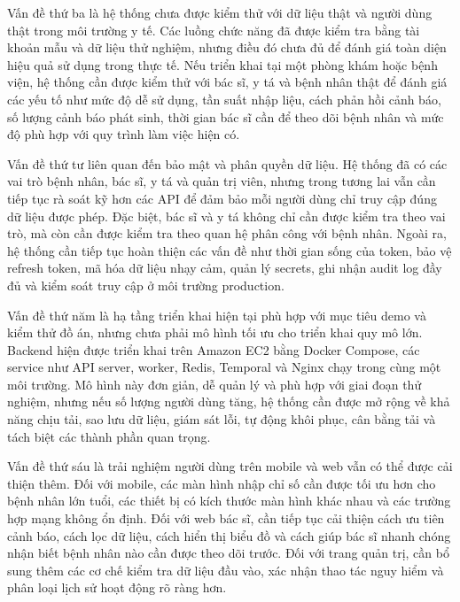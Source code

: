 \par Vấn đề thứ ba là hệ thống chưa được kiểm thử với dữ liệu thật và người dùng thật trong môi trường y tế. Các luồng chức năng đã được kiểm tra bằng tài khoản mẫu và dữ liệu thử nghiệm, nhưng điều đó chưa đủ để đánh giá toàn diện hiệu quả sử dụng trong thực tế. Nếu triển khai tại một phòng khám hoặc bệnh viện, hệ thống cần được kiểm thử với bác sĩ, y tá và bệnh nhân thật để đánh giá các yếu tố như mức độ dễ sử dụng, tần suất nhập liệu, cách phản hồi cảnh báo, số lượng cảnh báo phát sinh, thời gian bác sĩ cần để theo dõi bệnh nhân và mức độ phù hợp với quy trình làm việc hiện có.

\par Vấn đề thứ tư liên quan đến bảo mật và phân quyền dữ liệu. Hệ thống đã có các vai trò bệnh nhân, bác sĩ, y tá và quản trị viên, nhưng trong tương lai vẫn cần tiếp tục rà soát kỹ hơn các API để đảm bảo mỗi người dùng chỉ truy cập đúng dữ liệu được phép. Đặc biệt, bác sĩ và y tá không chỉ cần được kiểm tra theo vai trò, mà còn cần được kiểm tra theo quan hệ phân công với bệnh nhân. Ngoài ra, hệ thống cần tiếp tục hoàn thiện các vấn đề như thời gian sống của token, bảo vệ refresh token, mã hóa dữ liệu nhạy cảm, quản lý secrets, ghi nhận audit log đầy đủ và kiểm soát truy cập ở môi trường production.

\par Vấn đề thứ năm là hạ tầng triển khai hiện tại phù hợp với mục tiêu demo và kiểm thử đồ án, nhưng chưa phải mô hình tối ưu cho triển khai quy mô lớn. Backend hiện được triển khai trên Amazon EC2 bằng Docker Compose, các service như API server, worker, Redis, Temporal và Nginx chạy trong cùng một môi trường. Mô hình này đơn giản, dễ quản lý và phù hợp với giai đoạn thử nghiệm, nhưng nếu số lượng người dùng tăng, hệ thống cần được mở rộng về khả năng chịu tải, sao lưu dữ liệu, giám sát lỗi, tự động khôi phục, cân bằng tải và tách biệt các thành phần quan trọng.

\par Vấn đề thứ sáu là trải nghiệm người dùng trên mobile và web vẫn có thể được cải thiện thêm. Đối với mobile, các màn hình nhập chỉ số cần được tối ưu hơn cho bệnh nhân lớn tuổi, các thiết bị có kích thước màn hình khác nhau và các trường hợp mạng không ổn định. Đối với web bác sĩ, cần tiếp tục cải thiện cách ưu tiên cảnh báo, cách lọc dữ liệu, cách hiển thị biểu đồ và cách giúp bác sĩ nhanh chóng nhận biết bệnh nhân nào cần được theo dõi trước. Đối với trang quản trị, cần bổ sung thêm các cơ chế kiểm tra dữ liệu đầu vào, xác nhận thao tác nguy hiểm và phân loại lịch sử hoạt động rõ ràng hơn.

